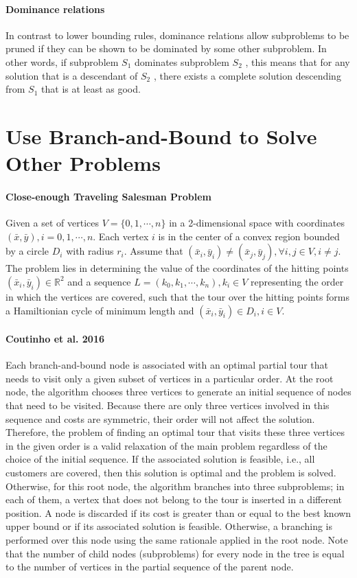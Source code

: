             \paragraph{Dominance relations}
                In contrast to lower bounding rules, dominance relations allow subproblems to be pruned if they can be shown to be dominated by some other subproblem. In other words, if subproblem $S_1$ dominates subproblem $S_2$ , this means that for any solution that is a descendant of $S_2$ , there exists a complete solution descending from $S_1$ that is at least as good. 

    \section{Use Branch-and-Bound to Solve Other Problems}
        \paragraph{Close-enough Traveling Salesman Problem}
            Given a set of vertices $V = \{0, 1, \cdots, n\}$ in a 2-dimensional space with coordinates $(\bar{x}, \bar{y}), i = 0, 1, \cdots, n$. Each vertex $i$ is in the center of a convex region bounded by a circle $D_i$ with radius $r_i$. Assume that $(\bar{x}_i, \bar{y}_i) \neq (\bar{x}_j, \bar{y}_j), \forall i, j \in V, i \neq j$. The problem lies in determining the value of the coordinates of the hitting points $(\bar{x}_i, \bar{y}_i) \in \mathbb{R}^2$ and a sequence $L = (k_0, k_1, \cdots, k_n), k_i \in V$ representing the order in which the vertices are covered, such that the tour over the hitting points forms a Hamiltionian cycle of minimum length and $(\bar{x}_i, \bar{y}_i) \in D_i, i \in V$.

        \paragraph{Coutinho et al. 2016} Each branch-and-bound node is associated with an optimal partial tour that needs to visit only a given subset of vertices in a particular order. At the root node, the algorithm chooses three vertices to generate an initial sequence of nodes that need to be visited. Because there are only three vertices involved in this sequence and costs are symmetric, their order will not affect the solution. Therefore, the problem of finding an optimal tour that visits these three vertices in the given order is a valid relaxation of the main problem regardless of the choice of the initial sequence. If the associated solution is feasible, i.e., all customers are covered, then this solution is optimal and the problem is solved. Otherwise, for this root node, the algorithm branches into three subproblems; in each of them, a vertex that does not belong to the tour is inserted in a different position. A node is discarded if its cost is greater than or equal to the best known upper bound or if its associated solution is feasible. Otherwise, a branching is performed over this node using the same rationale applied in the root node. Note that the number of child nodes (subproblems) for every node in the tree is equal to the number of vertices in the partial sequence of the parent node. \citep{Coutinho2016}


